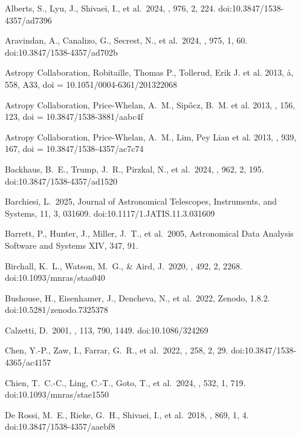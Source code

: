 \documentclass[twocolumn]{aastex63}
\begin{document}
{\begin{thebibliography}{}
 Alberts, S., Lyu, J., Shivaei, I., et al.\ 2024, \apj, 976, 2, 224. doi:10.3847/1538-4357/ad7396

 Aravindan, A., Canalizo, G., Secrest, N., et al.\ 2024, \apj, 975, 1, 60. doi:10.3847/1538-4357/ad702b

  {Astropy Collaboration}, {Robitaille}, Thomas P., 
         {Tollerud}, Erik J. et al.  2013, \aa, 558, A33,  doi = {10.1051/0004-6361/201322068}

 {Astropy Collaboration},  {Price-Whelan}, A.~M., {Sip{\H{o}}cz}, B.~M.  et al.  2013, \aj, 156, 123,   doi = {10.3847/1538-3881/aabc4f}
  
  {Astropy Collaboration},  {Price-Whelan}, A.~M., {Lim}, Pey Lian  et al.  2013, \apj, 939, 167,     doi = {10.3847/1538-4357/ac7c74}


 Backhaus, B.~E., Trump, J.~R., Pirzkal, N., et al.\ 2024, \apj, 962, 2, 195. doi:10.3847/1538-4357/ad1520

 Barchiesi, L.\ 2025, Journal of Astronomical Telescopes, Instruments, and Systems, 11, 3, 031609. doi:10.1117/1.JATIS.11.3.031609


 Barrett, P., Hunter, J., Miller, J.~T., et al.\ 2005, Astronomical Data Analysis Software and Systems XIV, 347, 91.

 Birchall, K.~L., Watson, M.~G., \& Aird, J.\ 2020, \mnras, 492, 2, 2268. doi:10.1093/mnras/staa040

 Bushouse, H., Eisenhamer, J., Dencheva, N., et al.\ 2022, Zenodo, 1.8.2. doi:10.5281/zenodo.7325378

 Calzetti, D.\ 2001, \pasp, 113, 790, 1449. doi:10.1086/324269

 Chen, Y.-P., Zaw, I., Farrar, G.~R., et al.\ 2022, \apjs, 258, 2, 29. doi:10.3847/1538-4365/ac4157

 Chien, T.~C.-C., Ling, C.-T., Goto, T., et al.\ 2024, \mnras, 532, 1, 719. doi:10.1093/mnras/stae1550

 De Rossi, M.~E., Rieke, G.~H., Shivaei, I., et al.\ 2018, \apj, 869, 1, 4. doi:10.3847/1538-4357/aaebf8


\end{thebibliography}}
\end{document}
